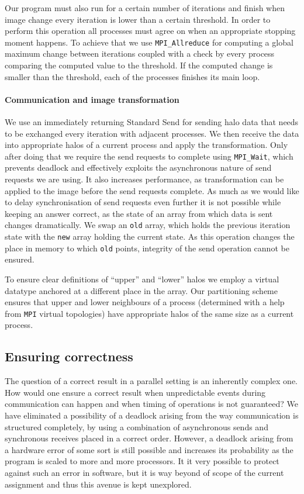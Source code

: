 \documentclass[11pt,a4paper]{article}
\begin{document}
Our program must also run for a certain number of iterations and finish when image change every iteration is lower than a certain threshold.
In order to perform this operation all processes must agree on when an appropriate stopping moment happens.
To achieve that we use \texttt{MPI\_Allreduce} for computing a global maximum change between iterations coupled with a check by every process comparing the computed value to the threshold.
If the computed change is smaller than the threshold, each of the processes finishes its main loop.

\paragraph{Communication and image transformation}
We use an immediately returning Standard Send for sending halo data that needs to be exchanged every iteration with adjacent processes.
We then receive the data into appropriate halos of a current process and apply the transformation. 
Only after doing that we require the send requests to complete using \texttt{MPI\_Wait}, which prevents deadlock and effectively exploits the asynchronous nature of send requests we are using.
It also increases performance, as transformation can be applied to the image before the send requests complete.
As much as we would like to delay synchronisation of send requests even further it is not possible while keeping an answer correct, as the state of an array from which data is sent changes dramatically.
We swap an \texttt{old} array, which holds the previous iteration state with the \texttt{new} array holding the current state.
As this operation changes the place in memory to which \texttt{old} points, integrity of the send operation cannot be ensured.

To ensure clear definitions of ``upper'' and ``lower'' halos we employ a virtual datatype anchored at a different place in the array.
Our partitioning scheme ensures that upper and lower neighbours of a process (determined with a help from \texttt{MPI} virtual topologies) have appropriate halos of the same size as a current process.

\subsection{Ensuring correctness}
\label{sec:correctness}
The question of a correct result in a parallel setting is an inherently complex one. 
How would one ensure a correct result when unpredictable events during communication can happen and when timing of operations is not guaranteed?
We have eliminated a possibility of a deadlock arising from the way communication is structured completely, by using a combination of asynchronous sends and synchronous receives placed in a correct order.
However, a deadlock arising from a hardware error of some sort is still possible and increases its probability as the program is scaled to more and more processors.
It it very possible to protect against such an error in software, but it is way beyond of scope of the current assignment and thus this avenue is kept unexplored.
\end{document}
